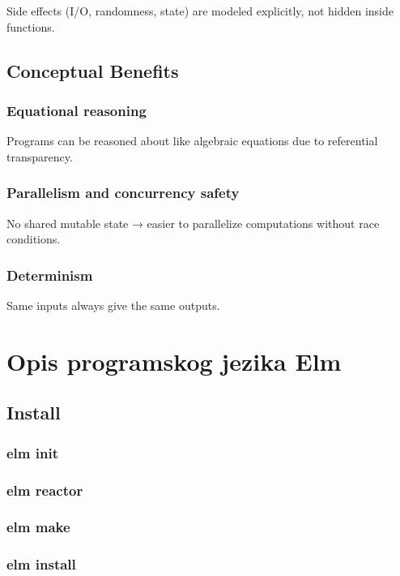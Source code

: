 \documentclass{viser-thesis}
\begin{document}
Side effects (I/O, randomness, state) are modeled explicitly, not hidden inside functions.

\newpage

\subsection{Conceptual Benefits}

\subsubsection{Equational reasoning}

Programs can be reasoned about like algebraic equations due to referential transparency.

\subsubsection{Parallelism and concurrency safety}

No shared mutable state → easier to parallelize computations without race conditions.

\subsubsection{Determinism}

Same inputs always give the same outputs.

\newpage

\section{Opis programskog jezika Elm}

\subsection{Install}

\subsubsection{elm init}
\subsubsection{elm reactor}
\subsubsection{elm make}
\subsubsection{elm install}
\end{document}
